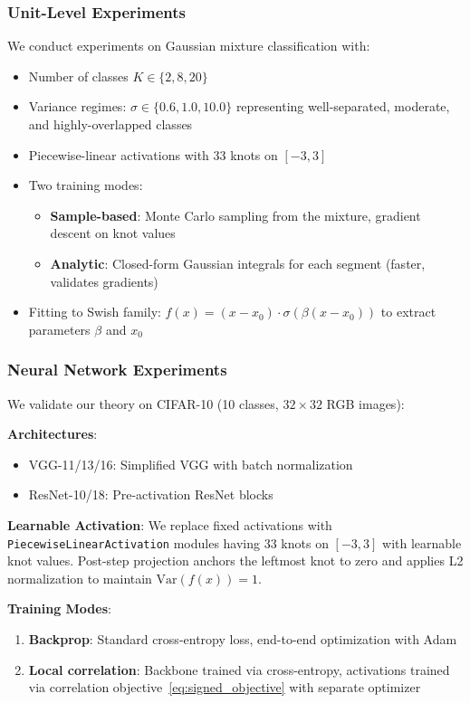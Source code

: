 \documentclass{article}
\begin{document}
\subsubsection{Unit-Level Experiments}

We conduct experiments on Gaussian mixture classification with:
\begin{itemize}
\item Number of classes $K \in \{2, 8, 20\}$
\item Variance regimes: $\sigma \in \{0.6, 1.0, 10.0\}$ representing well-separated, moderate, and highly-overlapped classes
\item Piecewise-linear activations with 33 knots on $[-3, 3]$
\item Two training modes:
  \begin{itemize}
  \item \textbf{Sample-based}: Monte Carlo sampling from the mixture, gradient descent on knot values
  \item \textbf{Analytic}: Closed-form Gaussian integrals for each segment (faster, validates gradients)
  \end{itemize}
\item Fitting to Swish family: $f(x) = (x-x_0) \cdot \sigma(\beta(x-x_0))$ to extract parameters $\beta$ and $x_0$
\end{itemize}

\subsubsection{Neural Network Experiments}

We validate our theory on CIFAR-10 (10 classes, $32 \times 32$ RGB images):

\textbf{Architectures}:
\begin{itemize}
\item VGG-11/13/16: Simplified VGG with batch normalization
\item ResNet-10/18: Pre-activation ResNet blocks
\end{itemize}

\textbf{Learnable Activation}: We replace fixed activations with \texttt{PiecewiseLinearActivation} modules having 33 knots on $[-3, 3]$ with learnable knot values. Post-step projection anchors the leftmost knot to zero and applies L2 normalization to maintain $\text{Var}(f(x)) = 1$.

\textbf{Training Modes}:
\begin{enumerate}
\item \textbf{Backprop}: Standard cross-entropy loss, end-to-end optimization with Adam
\item \textbf{Local correlation}: Backbone trained via cross-entropy, activations trained via correlation objective~\eqref{eq:signed_objective} with separate optimizer
\end{enumerate}
\end{document}
